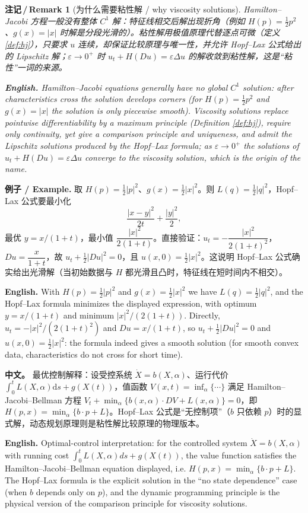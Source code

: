 \documentclass[UTF8,11pt,a4paper]{ctexart}
\newcommand{\APS}[2]{\par\noindent\textbf{中文。} #1\par\noindent\textbf{English.} #2\par\smallskip}
\newcommand{\EN}[1]{\par\noindent \textbf{English.} #1\par}
\newcommand{\EX}[2]{\par\noindent \textbf{例子 / Example.} #1\par\EN{#2}}
\newtheorem{remark}[definition]{注记\,/\,Remark}
\newcommand{\dd}{\mathrm{d}}
\begin{document}
\begin{remark}[为什么需要粘性解 / why viscosity solutions]\label{rem:visc}
Hamilton--Jacobi 方程一般没有整体 $C^1$ 解：特征线相交后解出现折角（例如 $H(p)=\frac12p^2$、$g(x)=|x|$ 时解是分段光滑的）。粘性解用极值原理代替逐点可微（定义 \ref{def:hj}），只要求 $u$ 连续，却保证比较原理与唯一性，并允许 Hopf--Lax 公式给出的 Lipschitz 解；$\varepsilon\to0^+$ 时 $u_t+H(Du)=\varepsilon\Delta u$ 的解收敛到粘性解，这是``粘性''一词的来源。\EN{Hamilton--Jacobi equations generally have no global $C^1$ solution: after characteristics cross the solution develops corners (for $H(p)=\frac12p^2$ and $g(x)=|x|$ the solution is only piecewise smooth). Viscosity solutions replace pointwise differentiability by a maximum principle (Definition \ref{def:hj}), require only continuity, yet give a comparison principle and uniqueness, and admit the Lipschitz solutions produced by the Hopf--Lax formula; as $\varepsilon\to0^+$ the solutions of $u_t+H(Du)=\varepsilon\Delta u$ converge to the viscosity solution, which is the origin of the name.}
\end{remark}

\EX{取 $H(p)=\frac12|p|^2$、$g(x)=\frac12|x|^2$。则 $L(q)=\frac12|q|^2$，Hopf--Lax 公式要最小化
\[
\frac{|x-y|^2}{2t}+\frac{|y|^2}{2},
\]
最优 $y=x/(1+t)$，最小值 $\dfrac{|x|^2}{2(1+t)}$。直接验证：$u_t=-\dfrac{|x|^2}{2(1+t)^2}$，$Du=\dfrac{x}{1+t}$，故 $u_t+\frac12|Du|^2=0$，且 $u(x,0)=\frac12|x|^2$。这说明 Hopf--Lax 公式确实给出光滑解（当初始数据与 $H$ 都光滑且凸时，特征线在短时间内不相交）。}{With $H(p)=\frac12|p|^2$ and $g(x)=\frac12|x|^2$ we have $L(q)=\frac12|q|^2$, and the Hopf--Lax formula minimizes the displayed expression, with optimum $y=x/(1+t)$ and minimum $|x|^2/(2(1+t))$. Directly, $u_t=-|x|^2/(2(1+t)^2)$ and $Du=x/(1+t)$, so $u_t+\frac12|Du|^2=0$ and $u(x,0)=\frac12|x|^2$: the formula indeed gives a smooth solution (for smooth convex data, characteristics do not cross for short time).}

\APS{最优控制解释：设受控系统 $\dot X=b(X,\alpha)$、运行代价 $\int_0^tL(X,\alpha)\dd s+g(X(t))$，值函数 $V(x,t)=\inf_\alpha\{\cdots\}$ 满足 Hamilton--Jacobi--Bellman 方程 $V_t+\min_\alpha\{b(x,\alpha)\cdot DV+L(x,\alpha)\}=0$，即 $H(p,x)=\min_\alpha\{b\cdot p+L\}$。Hopf--Lax 公式是``无控制项''（$b$ 只依赖 $p$）时的显式解，动态规划原理则是粘性解比较原理的物理版本。}{Optimal-control interpretation: for the controlled system $\dot X=b(X,\alpha)$ with running cost $\int_0^tL(X,\alpha)ds+g(X(t))$, the value function satisfies the Hamilton--Jacobi--Bellman equation displayed, i.e. $H(p,x)=\min_\alpha\{b\cdot p+L\}$. The Hopf--Lax formula is the explicit solution in the ``no state dependence'' case (when $b$ depends only on $p$), and the dynamic programming principle is the physical version of the comparison principle for viscosity solutions.}
\end{document}
